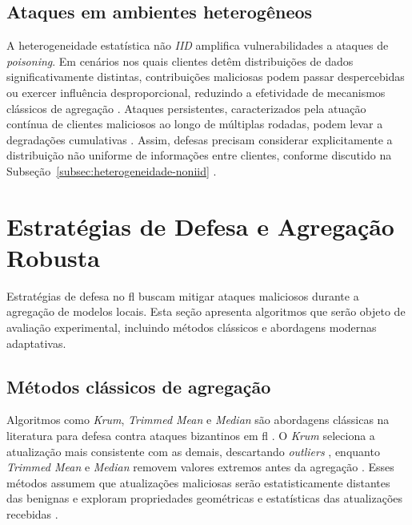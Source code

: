 \subsection{Ataques em ambientes heterogêneos}
\label{subsec:ataques-heterogeneos}

A heterogeneidade estatística não \textit{IID} amplifica vulnerabilidades a ataques de \textit{poisoning}. Em cenários nos quais clientes detêm distribuições de dados significativamente distintas, contribuições maliciosas podem passar despercebidas ou exercer influência desproporcional, reduzindo a efetividade de mecanismos clássicos de agregação \cite{Zhao2018,Li2023}. Ataques persistentes, caracterizados pela atuação contínua de clientes maliciosos ao longo de múltiplas rodadas, podem levar a degradações cumulativas \cite{Tolpegin2020,Bhagoji2019}. Assim, defesas precisam considerar explicitamente a distribuição não uniforme de informações entre clientes, conforme discutido na Subseção~\ref{subsec:heterogeneidade-noniid} \cite{Mothukuri2021,Sikandar2023}.

\section{Estratégias de Defesa e Agregação Robusta}
\label{sec:defesa-agregacao-robusta}

Estratégias de defesa no \gls{fl} buscam mitigar ataques maliciosos durante a agregação de modelos locais. Esta seção apresenta algoritmos que serão objeto de avaliação experimental, incluindo métodos clássicos e abordagens modernas adaptativas.

\subsection{Métodos clássicos de agregação}
\label{subsec:metodos-classicos}

Algoritmos como \textit{Krum}, \textit{Trimmed Mean} e \textit{Median} são abordagens clássicas na literatura para defesa contra ataques bizantinos em \gls{fl} \cite{Blanchard2017,Yin2018}. O \textit{Krum} seleciona a atualização mais consistente com as demais, descartando \textit{outliers} \cite{Blanchard2017}, enquanto \textit{Trimmed Mean} e \textit{Median} removem valores extremos antes da agregação \cite{Yin2018}. Esses métodos assumem que atualizações maliciosas serão estatisticamente distantes das benignas e exploram propriedades geométricas e estatísticas das atualizações recebidas \cite{Blanchard2017,Yin2018}.

